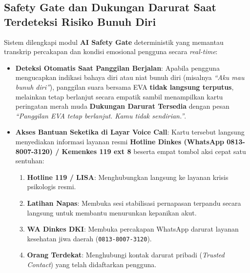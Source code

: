 
\subsection{Safety Gate dan Dukungan Darurat Saat Terdeteksi Risiko Bunuh Diri}
Sistem dilengkapi modul \textbf{AI Safety Gate} deterministik yang memantau transkrip percakapan dan kondisi emosional pengguna secara \textit{real-time}:
\begin{itemize}[leftmargin=1.4em]
  \item \textbf{Deteksi Otomatis Saat Panggilan Berjalan}: Apabila pengguna mengucapkan indikasi bahaya diri atau niat bunuh diri (misalnya \textit{``Aku mau bunuh diri''}), panggilan suara bersama EVA \textbf{tidak langsung terputus}, melainkan tetap berlanjut secara empatik sambil menampilkan kartu peringatan merah muda \textbf{Dukungan Darurat Tersedia} dengan pesan \textit{``Panggilan EVA tetap berlanjut. Kamu tidak sendirian.''}.
  \item \textbf{Akses Bantuan Seketika di Layar Voice Call}: Kartu tersebut langsung menyediakan informasi layanan resmi \textbf{Hotline Dinkes (WhatsApp 0813-8007-3120) / Kemenkes 119 ext 8} beserta empat tombol aksi cepat satu sentuhan:
  \begin{enumerate}[leftmargin=1.4em]
    \item \textbf{Hotline 119 / LISA}: Menghubungkan langsung ke layanan krisis psikologis resmi.
    \item \textbf{Latihan Napas}: Membuka sesi stabilisasi pernapasan terpandu secara langsung untuk membantu menurunkan kepanikan akut.
    \item \textbf{WA Dinkes DKI}: Membuka percakapan WhatsApp darurat layanan kesehatan jiwa daerah (\texttt{0813-8007-3120}).
    \item \textbf{Orang Terdekat}: Menghubungi kontak darurat pribadi (\textit{Trusted Contact}) yang telah didaftarkan pengguna.
  \end{enumerate}
\end{itemize}



